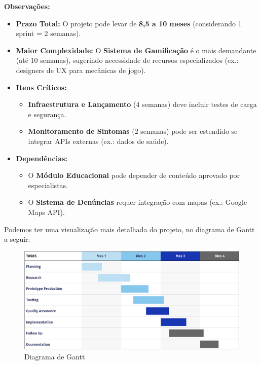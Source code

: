 \documentclass[a4paper, 12pt]{article}
\begin{document}
\noindent \textbf{Observações:}
\begin{itemize}
    \item \textbf{Prazo Total:} O projeto pode levar de \textbf{8,5 a 10 meses} (considerando 1 sprint = 2 semanas).
    \item \textbf{Maior Complexidade:} O \textbf{Sistema de Gamificação} é o mais demandante (até 10 semanas), sugerindo necessidade de recursos especializados (ex.: designers de UX para mecânicas de jogo).
    \item \textbf{Itens Críticos:} 
    \begin{itemize}
        \item \textbf{Infraestrutura e Lançamento} (4 semanas) deve incluir testes de carga e segurança.
        \item \textbf{Monitoramento de Sintomas} (2 semanas) pode ser estendido se integrar APIs externas (ex.: dados de saúde).
    \end{itemize}
    \item \textbf{Dependências:} 
    \begin{itemize}
        \item O \textbf{Módulo Educacional} pode depender de conteúdo aprovado por especialistas.
        \item O \textbf{Sistema de Denúncias} requer integração com mapas (ex.: Google Maps API).
    \end{itemize}
\end{itemize}

Podemos ter uma visualização mais detalhada do projeto, no diagrama de Gantt a seguir:

\begin{figure}[h]
    \centering
    \includegraphics[width=\textwidth,keepaspectratio]{2025-04-18_16-03-51_screenshot.png}
    \caption{Diagrama de Gantt}
    \label{fig:enter-label}
\end{figure}
\end{document}
